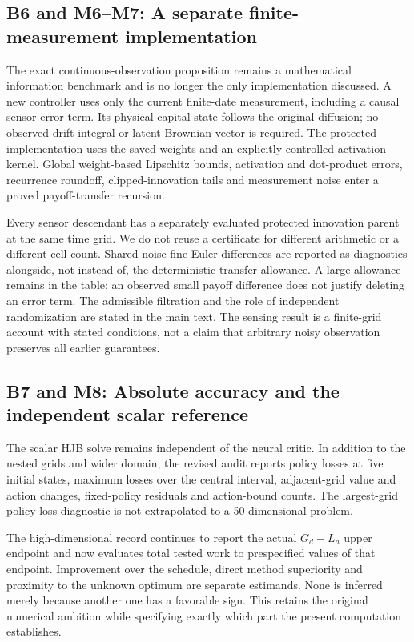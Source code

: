\subsection*{B6 and M6--M7: A separate finite-measurement implementation}
The exact continuous-observation proposition remains a mathematical information benchmark and is no longer the only implementation discussed. A new controller uses only the current finite-date measurement, including a causal sensor-error term. Its physical capital state follows the original diffusion; no observed drift integral or latent Brownian vector is required. The protected implementation uses the saved weights and an explicitly controlled activation kernel. Global weight-based Lipschitz bounds, activation and dot-product errors, recurrence roundoff, clipped-innovation tails and measurement noise enter a proved payoff-transfer recursion.

Every sensor descendant has a separately evaluated protected innovation parent at the same time grid. We do not reuse a certificate for different arithmetic or a different cell count. Shared-noise fine-Euler differences are reported as diagnostics alongside, not instead of, the deterministic transfer allowance. A large allowance remains in the table; an observed small payoff difference does not justify deleting an error term. The admissible filtration and the role of independent randomization are stated in the main text. The sensing result is a finite-grid account with stated conditions, not a claim that arbitrary noisy observation preserves all earlier guarantees.

\subsection*{B7 and M8: Absolute accuracy and the independent scalar reference}
The scalar HJB solve remains independent of the neural critic. In addition to the nested grids and wider domain, the revised audit reports policy losses at five initial states, maximum losses over the central interval, adjacent-grid value and action changes, fixed-policy residuals and action-bound counts. The largest-grid policy-loss diagnostic is not extrapolated to a 50-dimensional problem.

The high-dimensional record continues to report the actual $G_d-L_a$ upper endpoint and now evaluates total tested work to prespecified values of that endpoint. Improvement over the schedule, direct method superiority and proximity to the unknown optimum are separate estimands. None is inferred merely because another one has a favorable sign. This retains the original numerical ambition while specifying exactly which part the present computation establishes.

